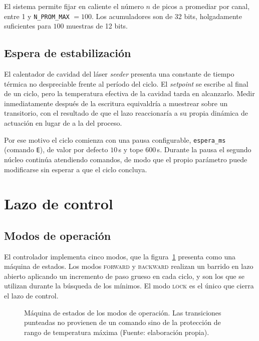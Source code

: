 El sistema permite fijar en caliente el número $n$ de picos a promediar por canal, entre 1 y \texttt{N\_PROM\_MAX} $=100$. Los acumuladores son de 32 bits, holgadamente suficientes para $100$ muestras de 12 bits.

\subsection{Espera de estabilización}

El calentador de cavidad del láser \emph{seeder} presenta una constante de tiempo térmica no despreciable frente al período del ciclo. El \emph{setpoint} se escribe al final de un ciclo, pero la temperatura efectiva de la cavidad tarda en alcanzarlo. Medir inmediatamente después de la escritura equivaldría a muestrear sobre un transitorio, con el resultado de que el lazo reaccionaría a su propia dinámica de actuación en lugar de a la del proceso.

Por ese motivo el ciclo comienza con una pausa configurable, \texttt{espera\_ms} (comando \texttt{E}), de valor por defecto $10$\,s y tope $600$\,s. Durante la pausa el segundo núcleo continúa atendiendo comandos, de modo que el propio parámetro puede modificarse sin esperar a que el ciclo concluya.

\section{Lazo de control}
\label{sec:fw-control}

\subsection{Modos de operación}

El controlador implementa cinco modos, que la figura~\ref{fig:fw-estados} presenta como una máquina de estados. Los modos \textsc{forward} y \textsc{backward} realizan un barrido en lazo abierto aplicando un incremento de paso grueso en cada ciclo, y son los que se utilizan durante la búsqueda de los mínimos. El modo \textsc{lock} es el único que cierra el lazo de control.

\begin{figure}[h]
\centering
\resizebox{\textwidth}{!}{}
\caption[Máquina de estados de los modos de operación]%
{Máquina de estados de los modos de operación. Las transiciones punteadas no provienen de un comando sino de la protección de rango de temperatura máxima (Fuente: elaboración propia).}
\label{fig:fw-estados}
\end{figure}

